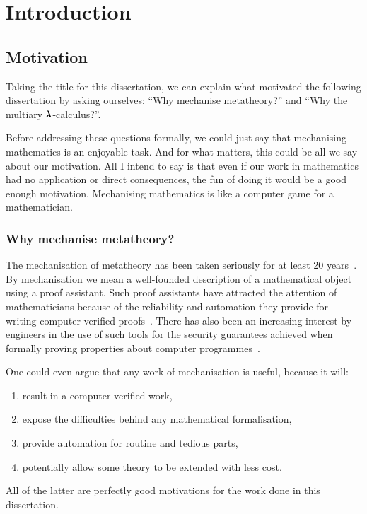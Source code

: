 \chapter{Introduction}
\label{c:intro}

\section{Motivation}
Taking the title for this dissertation, we can explain what motivated the following dissertation by asking ourselves: ``Why mechanise metatheory?'' and ``Why the multiary $\pmb{\lambda}$-calculus?''.

Before addressing these questions formally, we could just say that mechanising mathematics is an enjoyable task.
And for what matters, this could be all we say about our motivation.
All I intend to say is that even if our work in mathematics had no application or direct consequences, the fun of doing it would be a good enough motivation.
Mechanising mathematics is like a computer game for a mathematician.

\subsection{Why mechanise metatheory?}
The mechanisation of metatheory has been taken seriously for at least 20 years~\cite{POPLmark}.
By mechanisation we mean a well-founded description of a mathematical object using a proof assistant.
Such proof assistants have attracted the attention of mathematicians because of the reliability and automation they provide for writing computer verified proofs~\cite{FourColourThm}.
There has also been an increasing interest by engineers in the use of such tools for the security guarantees achieved when formally proving properties about computer programmes~\cite{CompCert}.

One could even argue that any work of mechanisation is useful, because it will:
\begin{enumerate}
\item result in a computer verified work,
\item expose the difficulties behind any mathematical formalisation,
\item provide automation for routine and tedious parts,
\item potentially allow some theory to be extended with less cost.
\end{enumerate}

All of the latter are perfectly good motivations for the work done in this dissertation.

